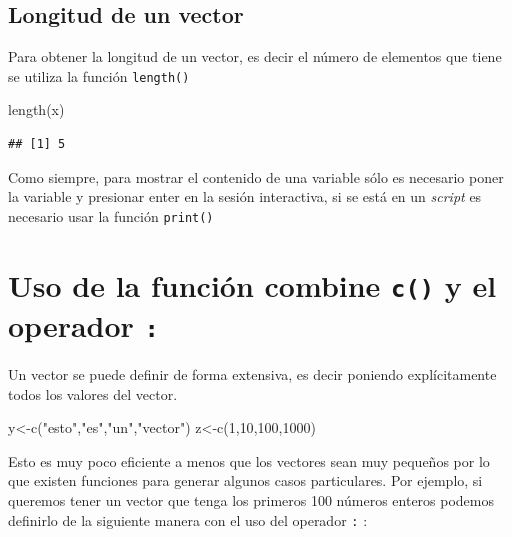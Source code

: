 \documentclass[
]{book}
\newenvironment{Shaded}{\begin{snugshade}}{\end{snugshade}}
\newcommand{\DecValTok}[1]{\textcolor[rgb]{0.00,0.00,0.81}{#1}}
\newcommand{\FunctionTok}[1]{\textcolor[rgb]{0.00,0.00,0.00}{#1}}
\newcommand{\NormalTok}[1]{#1}
\newcommand{\OtherTok}[1]{\textcolor[rgb]{0.56,0.35,0.01}{#1}}
\newcommand{\StringTok}[1]{\textcolor[rgb]{0.31,0.60,0.02}{#1}}
\begin{document}
\hypertarget{longitud-de-un-vector}{%
\subsection{Longitud de un vector}\label{longitud-de-un-vector}}

Para obtener la longitud de un vector, es decir el número de elementos que tiene
se utiliza la función \texttt{length()}

\begin{Shaded}
\begin{Highlighting}[]
\FunctionTok{length}\NormalTok{(x)}
\end{Highlighting}
\end{Shaded}

\begin{verbatim}
## [1] 5
\end{verbatim}

Como siempre, para mostrar el contenido de una variable
sólo es necesario poner la variable y presionar enter en la sesión interactiva, si se está en un \emph{script} es necesario usar la función \texttt{print()}

\hypertarget{uso-de-la-funciuxf3n-combine-c-y-el-operador}{%
\section{\texorpdfstring{Uso de la función combine \texttt{c()} y el operador \texttt{:}}{Uso de la función combine c() y el operador :}}\label{uso-de-la-funciuxf3n-combine-c-y-el-operador}}

Un vector se puede definir de forma extensiva, es decir poniendo explícitamente todos los valores del vector.

\begin{Shaded}
\begin{Highlighting}[]
\NormalTok{y}\OtherTok{\textless{}{-}}\FunctionTok{c}\NormalTok{(}\StringTok{"esto"}\NormalTok{,}\StringTok{"es"}\NormalTok{,}\StringTok{"un"}\NormalTok{,}\StringTok{"vector"}\NormalTok{)}
\NormalTok{z}\OtherTok{\textless{}{-}}\FunctionTok{c}\NormalTok{(}\DecValTok{1}\NormalTok{,}\DecValTok{10}\NormalTok{,}\DecValTok{100}\NormalTok{,}\DecValTok{1000}\NormalTok{)}
\end{Highlighting}
\end{Shaded}

Esto es muy poco eficiente a menos que los vectores sean muy pequeños por lo que existen funciones para generar algunos casos particulares.
Por ejemplo, si queremos tener un vector que tenga los primeros 100 números enteros podemos definirlo de la siguiente manera con el uso del operador \texttt{:} :
\end{document}

